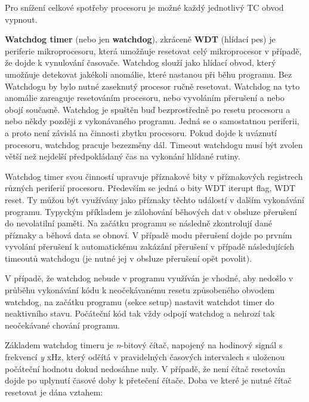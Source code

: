 Pro snížení celkové spotřeby procesoru je možné každý jednotlivý TC obvod vypnout. 














{\bf Watchdog timer} (nebo jen {\bf watchdog}), zkráceně {\bf WDT} (hlídací pes) je periferie mikroprocesoru, která umožňuje resetovat celý mikroprocesor v případě, že dojde k vynulování časovače. Watchdog slouží jako hlídací obvod, který umožňuje detekovat jakékoli anomálie, které nastanou při běhu programu. Bez Watchdogu by bylo nutné zaseknutý procesor ručně resetovat. Watchdog na tyto anomálie zareaguje resetováním procesoru, nebo vyvoláním přerušení a nebo obojí současně. Watchdog je spuštěn buď bezprostředně po resetu procesoru a nebo někdy později z vykonávaného programu. Jedná se o samostatnou periferii, a proto není závislá na činnosti zbytku procesoru. Pokud dojde k uváznutí procesoru, watchdog pracuje bezezměny dál. Timeout watchdogu musí být zvolen větší než nejdelší předpokládaný čas na vykonání hlídané rutiny.

Watchdog timer svou činností upravuje příznakové bity v příznakových registrech různých periferií procesoru. Především se jedná o bity WDT iterupt flag, WDT reset. Ty můžou být využívány jako příznaky těchto událostí v dalším vykonávání programu. Typyckým příkladem je zálohování běhových dat v obsluze přerušení do nevolatilní paměti. Na začátku programu se následně zkontrolují dané příznaky a běhová data se obnoví. V případě modu přerušení dojde po prvním vyvolání přerušení k automatickému zakázání přerušení v případě následujících timeoutů watchdogu (je nutné jej v obsluze přerušení opět povolit).

V případě, že watchdog nebude v programu využíván je vhodné, aby nedošlo v průběhu vykonávání kódu k neočekávanému resetu způsobeného obvodem watchdog, na začátku programu (sekce setup) nastavit watchdot timer do neaktivního stavu. Počáteční kód tak vždy odpojí watchdog a nehrozí tak neočekávané chování programu.


Základem watchdog timeru je {\it n}-bitový čítač, napojený na hodinový signál s frekvencí {\it y} xHz, který odčítá v pravidelných časových intervalech s uloženou počáteční hodnotu dokud nedosáhne nuly. V případě, že není čítač resetován dojde po uplynutí časové doby k přetečení čítače. Doba ve které je nutné čítač resetovat je dána vztahem:

